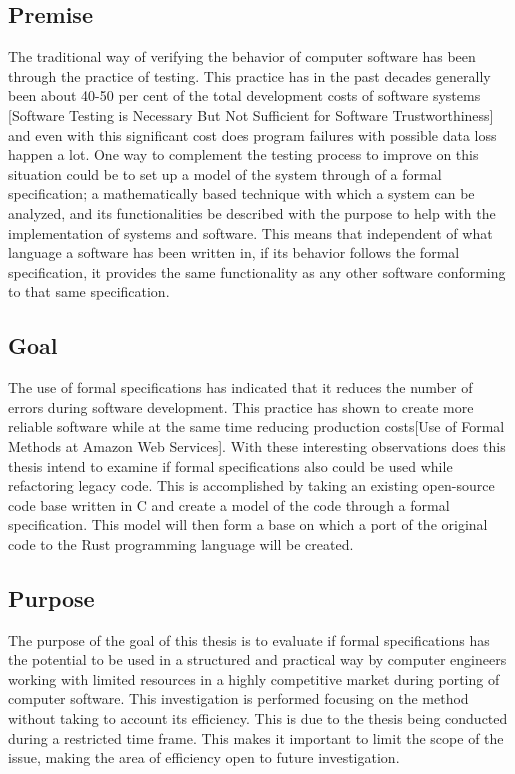 \documentclass{article}
\begin{document}
\subsection{Premise}
The traditional way of verifying the behavior of computer software has been through the practice of testing. This practice has in the past decades generally been about 40-50 per cent of the total development costs of software systems [Software Testing is Necessary But Not Sufficient for Software Trustworthiness] and even with this significant cost does program failures with possible data loss happen a lot. One way to complement the testing process to improve on this situation could be to set up a model of the system through of a formal specification; a mathematically based technique with which a system can be analyzed, and its functionalities be described with the purpose to help with the implementation of systems and software. This means that independent of what language a software has been written in, if its behavior follows the formal specification, it provides the same functionality as any other software conforming to that same specification.
\subsection{Goal}
The use of formal specifications has indicated that it reduces the number of errors during software development. This practice has shown to create more reliable software while at the same time reducing production costs[Use of Formal Methods at Amazon Web Services]. With these interesting observations does this thesis intend to examine if formal specifications also could be used while refactoring legacy code. This is accomplished by taking an existing open-source code base written in C and create a model of the code through a formal specification. This model will then form a base on which a port of the original code to the Rust programming language will be created.
\subsection{Purpose}
The purpose of the goal of this thesis is to evaluate if formal specifications has the potential to be used in a structured and practical way by computer engineers working with limited resources in a highly competitive market during porting of computer software. This investigation is performed focusing on the method without taking to account its efficiency. This is due to the thesis being conducted during a restricted time frame. This makes it important to limit the scope of the issue, making the area of efficiency open to future investigation.
\end{document}
